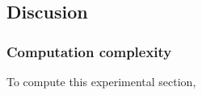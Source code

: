 \documentclass[twoside]{article}
\begin{document}
%		
%		
%


\subsection{Discusion}
\label{subsec:Discusion}


\subsubsection{Computation complexity}
To compute this experimental section, 





















 

\end{document}
